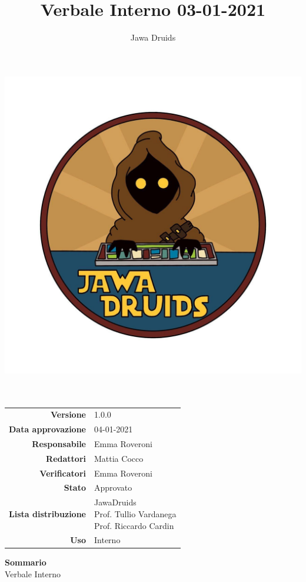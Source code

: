 



	\makeatletter
	\begin{titlepage}
		\begin{center}
			\vspace*{-5cm}
			\author{Jawa Druids}
			\title{Verbale Interno 03-01-2021}
			\date{} %
			\includegraphics[width=0.7\linewidth]{../../immagini/DRUIDSLOGO.jpg}\\[4ex]
			{\huge \bfseries  \@title }\\[2ex]
			{\LARGE  \@author}\\[50ex]
			\vspace*{-9cm}
			\begin{table}[H]
				\renewcommand{\arraystretch}{1.4}
				\centering
				\begin{tabular}{r | l}
					\textbf{Versione} & 1.0.0 \\%
					\textbf{Data approvazione} & 04-01-2021\\
					\textbf{Responsabile} & Emma Roveroni\\
					\textbf{Redattori} & Mattia Cocco \\
					\textbf{Verificatori} & Emma Roveroni \\
					\textbf{Stato} & Approvato\\
					\textbf{Lista distribuzione} & \makecell[tl]{ JawaDruids \\ Prof. Tullio Vardanega \\ Prof. Riccardo Cardin }\\
					\textbf{Uso} & Interno
				\end{tabular}
			\end{table}
			\vspace{0.1cm}
			\hfill \break
			\fontsize{17}{10}\textbf{Sommario} \\
			\vspace{0.1cm}
			Verbale Interno
		\end{center}
	\end{titlepage}
	\makeatother
	
	\newpage
	\tableofcontents{}
	

